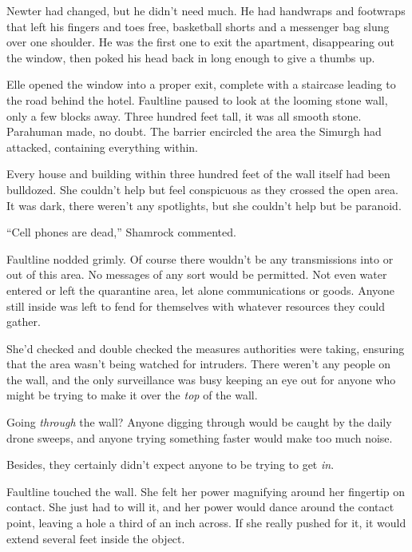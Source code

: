 Newter had changed, but he didn't need much.  He had handwraps and footwraps that left his fingers and toes free, basketball shorts and a messenger bag slung over one shoulder.  He was the first one to exit the apartment, disappearing out the window, then poked his head back in long enough to give a thumbs up.



Elle opened the window into a proper exit, complete with a staircase leading to the road behind the hotel.  Faultline paused to look at the looming stone wall, only a few blocks away.  Three hundred feet tall, it was all smooth stone.  Parahuman made, no doubt.  The barrier encircled the area the Simurgh had attacked, containing everything within.



Every house and building within three hundred feet of the wall itself had been bulldozed.  She couldn't help but feel conspicuous as they crossed the open area.  It was dark, there weren't any spotlights, but she couldn't help but be paranoid.



``Cell phones are dead,'' Shamrock commented.



Faultline nodded grimly.  Of course there wouldn't be any transmissions into or out of this area.  No messages of any sort would be permitted.  Not even water entered or left the quarantine area, let alone communications or goods.  Anyone still inside was left to fend for themselves with whatever resources they could gather.



She'd checked and double checked the measures authorities were taking, ensuring that the area wasn't being watched for intruders.  There weren't any people on the wall, and the only surveillance was busy keeping an eye out for anyone who might be trying to make it over the \emph{top} of the wall.



Going \emph{through} the wall?  Anyone digging through would be caught by the daily drone sweeps, and anyone trying something faster would make too much noise.



Besides, they certainly didn't expect anyone to be trying to get \emph{in}.



Faultline touched the wall.  She felt her power magnifying around her fingertip on contact.  She just had to will it, and her power would dance around the contact point, leaving a hole a third of an inch across.  If she really pushed for it, it would extend several feet inside the object.



